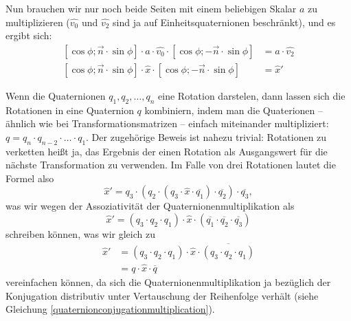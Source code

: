 Nun brauchen wir nur noch beide Seiten mit einem beliebigen Skalar $a$ zu multiplizieren ($\hat{v_0}$ und $\hat{v_2}$ sind ja auf Einheitsquaternionen beschränkt), und es ergibt sich:
\begin{equation}
\begin{split}
 \left[ \cos \phi; \vec n \cdot \sin \phi \right] \cdot a \cdot \hat{v_0} \cdot \left[ \cos \phi; -\vec n \cdot \sin \phi \right] &= a \cdot \hat{v_2} \\
 \left[ \cos \phi; \vec n \cdot \sin \phi \right] \cdot \hat{x} \cdot \left[ \cos \phi; -\vec n \cdot \sin \phi \right] &= \hat{x}'
\end{split}
\end{equation}

Wenn die Quaternionen $q_1, q_2, \ldots, q_n$ eine Rotation darstelen, dann lassen sich die Rotationen in eine Quaternion $q$ kombiniern, indem man die Quaterionen -- ähnlich wie bei Transformationsmatrizen -- einfach miteinander multipliziert: $q = q_n \cdot q_{n-2} \cdot \ldots \cdot q_1$. Der zugehörige Beweis ist nahezu trivial: Rotationen zu verketten heißt ja, das Ergebnis der einen Rotation als Ausgangswert für die nächste Transformation zu verwenden. Im Falle von drei Rotationen lautet die Formel also
\begin{equation}
 \hat{x}' = q_3 \cdot ( q_2 \cdot ( q_3 \cdot \hat{x} \cdot \overline{q_1} ) \cdot \overline{q_2} ) \cdot \overline{q_3},
\end{equation}
was wir wegen der Assoziativität der Quaternionenmultiplikation als 
\begin{equation}
 \hat{x}' = ( q_3 \cdot q_2 \cdot q_1 ) \cdot \hat{x} \cdot ( \overline{q_1} \cdot \overline{q_2} \cdot \overline{q_3} )
\end{equation}
schreiben können, was wir gleich zu
\begin{equation}
\begin{split}
 \hat{x}' &= ( q_3 \cdot q_2 \cdot q_1 ) \cdot \hat{x} \cdot \overline{( q_3 \cdot q_2 \cdot q_1 )} \\
 &= q \cdot \hat{x} \cdot \overline{q}
\end{split}
\end{equation} 
vereinfachen können, da sich die Quaternionenmultiplikation ja bezüglich der Konjugation distributiv unter Vertauschung der Reihenfolge verhält (siehe Gleichung \ref{quaternionconjugationmultiplication}).

